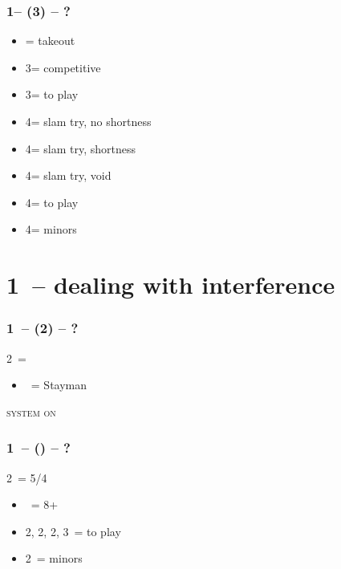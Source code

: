 \subsubsection*{1\spades -- (3\hearts) -- ?}
\begin{itemize}
    \item \dbl = takeout
    \item 3\spades = competitive
    \item 3\nt = to play
    \item 4\clubs = slam try, no \diams shortness
    \item 4\diams = slam try, \diams shortness
    \item 4\hearts = slam try, \hearts void
    \item 4\spades = to play
    \item 4\nt = minors
\end{itemize}

\section{\texorpdfstring{1\ntx\ -- dealing with interference}{1ntInterference}}\label{sec:1ntInterference}

\subsubsection*{1\ntx\ -- (2\clubs) -- ?}
2\clubs\ = \clubs
\begin{itemize}
    \item \dbl\ = Stayman
\end{itemize}

\textsc{system on}

\subsubsection*{1\ntx\ -- (\alrts{2\clubs}) -- ?}
2\clubs\ = 5/4 \major
\begin{itemize}
    \item \dbl\ = 8+
    \item 2\diams, 2\hearts, 2\spades, 3\clubs\ = to play
    \item 2\nt\ = minors
\end{itemize}

